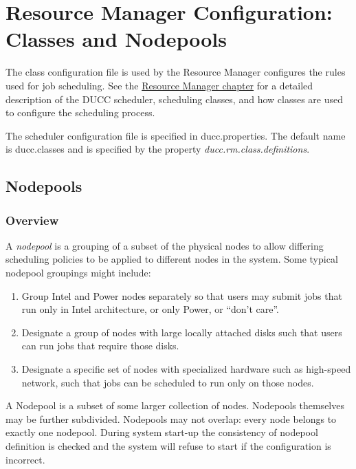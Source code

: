 \section{Resource Manager Configuration: Classes and Nodepools}
\label{sec:ducc.classes}

The class configuration file is used by the Resource Manager configures the rules used for job
scheduling. See the \hyperref[chap:rm]{Resource Manager chapter} for a detailed description of the DUCC
scheduler, scheduling classes, and how classes are used to configure the scheduling process.

The scheduler  configuration file is specified in ducc.properties. The default name is 
ducc.classes and is specified by the property {\em ducc.rm.class.definitions}.
  
\subsection{Nodepools}
\label{subsec:nodepools}

\subsubsection{Overview}
    A {\em nodepool} is a grouping of a subset of the physical nodes to allow differing
    scheduling policies to be applied to different nodes in the system.  Some typical
    nodepool groupings might include:
    \begin{enumerate}
      \item Group Intel and Power nodes separately so that users may submit jobs that run
        only in Intel architecture, or only Power, or ``don't care''.
      \item Designate a group of nodes with large locally attached disks such that users
        can run jobs that require those disks.
      \item Designate a specific set of nodes with specialized hardware such as high-speed
        network, such that jobs can be scheduled to run only on those nodes.
    \end{enumerate}

    A Nodepool is a subset of some larger collection of nodes.  Nodepools themselves may be
    further subdivided.  Nodepools may not overlap: every node belongs to exactly
    one nodepool.  During system start-up the consistency of nodepool definition is checked
    and the system will refuse to start if the configuration is incorrect.


